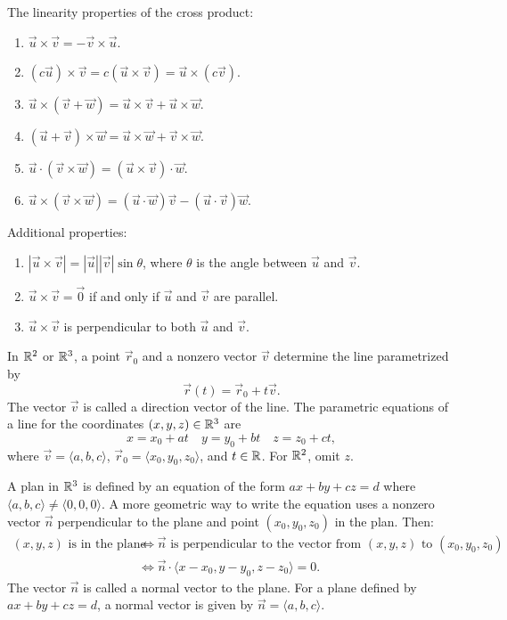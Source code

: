 \begin{facts}
	The linearity properties of the cross product:
	\begin{enumerate}
		\item $\vec{u} \times \vec{v} = -\vec{v} \times \vec{u}$.
		\item $(c \vec{u}) \times \vec{v} = c(\vec{u} \times \vec{v}) = \vec{u}
			\times (c \vec{v})$.
		\item $\vec{u} \times (\vec{v} + \vec{w}) = \vec{u} \times \vec{v} + \vec{u}
			\times \vec{w}$.
		\item $(\vec{u} + \vec{v}) \times \vec{w} = \vec{u} \times \vec{w} + \vec{v}
			\times \vec{w}$.
		\item $\vec{u} \cdot (\vec{v} \times \vec{w}) = (\vec{u} \times \vec{v})
			\cdot \vec{w}$.
		\item $\vec{u} \times (\vec{v} \times \vec{w}) = (\vec{u} \cdot \vec{w})
			\vec{v} - (\vec{u} \cdot \vec{v}) \vec{w}$.
	\end{enumerate}
	Additional properties:
	\begin{enumerate}
		\item $|\vec{u} \times \vec{v}| = |\vec{u}| |\vec{v}| \sin \theta$, where
			$\theta$ is the angle between $\vec{u}$ and $\vec{v}$.
		\item $\vec{u} \times \vec{v} = \vec{0}$ if and only if $\vec{u}$ and
			$\vec{v}$ are parallel.
		\item $\vec{u} \times \vec{v}$ is perpendicular to both $\vec{u}$ and
			$\vec{v}$.
	\end{enumerate}
\end{facts}

\begin{definition}
	In ${\mathbb{R}}^2$ or ${\mathbb{R}}^3$, a point $\vec{r}_0$ and a nonzero vector $\vec{v}$
	determine the line parametrized by
	\[
		\vec{r}(t) = \vec{r}_0 + t \vec{v}.
	\]
	The vector $\vec{v}$ is called a direction vector of the line. The parametric
	equations of a line for the coordinates $(x, y, z) \in {\mathbb{R}}^3$ are
	\[
		x = x_0 + at \quad y = y_0 + bt \quad z = z_0 + ct,
	\]
	where $\vec{v} = \langle a, b, c \rangle$, $\vec{r}_0 = \langle x_0, y_0, z_0
	\rangle$, and $t \in {\mathbb{R}}$. For ${\mathbb{R}}^2$, omit $z$.
\end{definition}

\begin{definition}
	A plan in ${\mathbb{R}}^3$ is defined by an equation of the form $ax + by + cz = d$
	where $\langle a, b, c \rangle \neq \langle 0, 0, 0 \rangle$. A more geometric
	way to write the equation uses a nonzero vector $\vec{n}$ perpendicular to the
	plane and point $(x_0, y_0, z_0)$ in the plan. Then:
	\begin{align*}
		(x, y, z) \text{ is in the plane } &\Longleftrightarrow \vec{n} \text{ is
		perpendicular to the vector from } (x, y, z) \text{ to } (x_0, y_0, z_0) \\
		& \Longleftrightarrow \vec{n} \cdot \langle x - x_0, y - y_0, z - z_0
		\rangle = 0.
	\end{align*}
	The vector $\vec{n}$ is called a normal vector to the plane. For a plane
	defined by $ax + by +cz = d$, a normal vector is given by $\vec{n} = \langle
	a, b, c \rangle$.
\end{definition}

